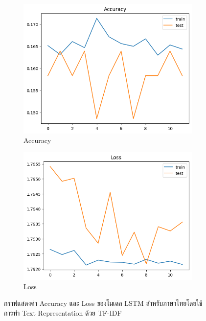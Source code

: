 \documentclass[12pt,oneside,openright,a4paper]{cpe-thai-project}
\begin{document}
      \begin{figure}[!ht]\centering
        \begin{subfigure}{0.49\textwidth}
          \includegraphics[width=\linewidth]{./img/lstm_tfidf_thai_acc.png} 
          \caption{Accuracy}
          \label{fig:lstm_tfidf_thai_acc}
        \end{subfigure}
        \begin{subfigure}{0.49\textwidth}
          \includegraphics[width=\linewidth]{./img/lstm_tfidf_thai_loss.png}
          \caption{Loss}
          \label{fig:lstm_tfidf_thai_loss}
        \end{subfigure}
        \caption{กราฟแสดงค่า Accuracy และ Loss ของโมเดล LSTM สำหรับภาษาไทยโดยใช้การทำ Text Representation ด้วย TF-IDF}
        \label{fig:lstm_tfidf_thai}
      \end{figure}
\end{document}
